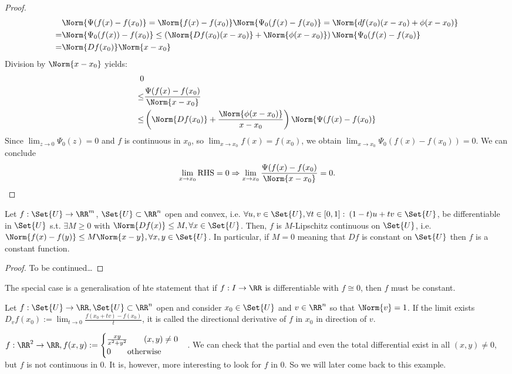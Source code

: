 \begin{proof}
\begin{align*}
  	&\Norm{\Psi(f(x)-f(x_0)}=\Norm{f(x)-f(x_0)}\Norm{\Psi_0(f(x)-f(x_0)}=\Norm{df(x_0)(x-x_0)+\phi(x-x_0)}\\
  	=&\Norm{\Psi_0(f(x))-f(x_0)}\leq\left(\Norm{Df(x_0)(x-x_0)}+\Norm{\phi(x-x_0)}\right)\Norm{\Psi_0(f(x)-f(x_0)}\\
  	=&\Norm{Df(x_0)}\Norm{x-x_0}
  \end{align*}
  Division by $\Norm{x-x_0}$ yields:
  \begin{align*}
  	0&\\\leq&\frac{\Psi(f(x)-f(x_0)}{\Norm{x-x_0}}\\
  	\leq&\left(\Norm{Df(x_0)}+\frac{\Norm{\phi(x-x_0)}}{x-x_0}\right)\Norm{\Psi(f(x)-f(x_0)}
  \end{align*}
  Since $\lim_{z\to 0}\Psi_0(z)=0$ and $f$ is continuous in $x_0$, so $\lim_{x\to x_0}f(x)=f(x_0)$, we obtain $\lim_{x\to x_0}\Psi_0(f(x)-f(x_0))=0$. We can conclude \[\lim_{x\to x_0}\text{RHS}=0\Rightarrow\lim_{x\to x_0}\frac{\Psi(f(x)-f(x_0)}{\Norm{x-x_0}}=0.\]
\end{proof}
\begin{prop}[Lipschitz continuity and $Df=0\Rightarrow f$ constant]
  Let $f:\Set{U}\to \RR^m$, $\Set{U}\subset\RR^n$ open and convex, i.e. $\forall u, v\in\Set{U}, \forall t\in[0,1]:\:(1-t)u+tv\in\Set{U}$, be differentiable in $\Set{U}$ s.t. $\exists M\geq 0$ with $\Norm{Df(x)}\leq M, \forall x\in\Set{U}$. Then, $f$ is $M$-Lipschitz continuous on $\Set{U}$, i.e. $\Norm{f(x)-f(y)}\leq M\Norm{x-y}, \forall x, y\in\Set{U}$. In particular, if $M=0$ meaning that $Df$ is constant on $\Set{U}$ then $f$ is a constant function.
\end{prop}
\begin{proof}
  To be continued\ldots
\end{proof}
\begin{rem}
  The special case is a generalisation of hte statement that if $f:I\to \RR$ is differentiable with $f\cong 0$, then $f$ must be constant. 
\end{rem}
\begin{defn}
  Let $f:\Set{U}\to\RR, \Set{U}\subset\RR^n$ open and consider $x_0\in\Set{U}$ and $v\in\RR^n$ so that $\Norm{v}=1$. If the limit exists $D_vf(x_0):=\lim_{t\to 0}\frac{f(x_0+tv)-f(x_0)}{t}$, it is called the directional derivative of $f$ in $x_0$ in direction of $v$. 
\end{defn}
\begin{exam}
  $f:\RR^2\to \RR, f(x,y):=\begin{cases}
  \frac{xy}{x^2+y^2}\qquad (x,y)\neq 0\\0\qquad\text{otherwise}\end{cases}$. We can check that the partial and even the total differential exist in all $(x,y)\neq 0$, but $f$ is not continuous in $0$. It is, however, more interesting to look for $f$ in $0$. So we will later come back to this example. 
\end{exam}
